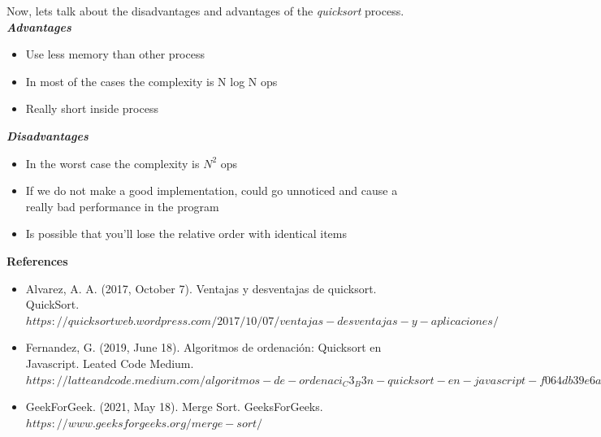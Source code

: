 \documentclass[12pt, letterpaper]{article}
\begin{document}
Now, lets talk about the disadvantages and advantages of the \textit{quicksort} process.
\\
\textbf{\textit{Advantages}}
\begin{itemize}
\item Use less memory than other process
\item In most of the cases the complexity is N log N ops
\item Really short inside process
\end{itemize}
\textbf{\textit{Disadvantages}}
\begin{itemize}
\item In the worst case the complexity is ${N^2}$ ops
\item If we do not make a good implementation, could go unnoticed and cause a really bad performance in the program
\item Is possible that you'll lose the relative order with identical items
\end{itemize}
\newpage
\textbf{References}
\begin{itemize}
\item Alvarez, A. A. (2017, October 7). Ventajas y desventajas de quicksort. QuickSort. $https://quicksortweb.wordpress.com/2017/10/07/ventajas-desventajas-y-aplicaciones/$
\item Fernandez, G. (2019, June 18). Algoritmos de ordenación: Quicksort en Javascript. Leated Code Medium. $https://latteandcode.medium.com/algoritmos-de-ordenaci_C3_B3n-quicksort-en-javascript-f064db39e6ad$
\item GeekForGeek. (2021, May 18). Merge Sort. GeeksForGeeks. $https://www.geeksforgeeks.org/merge-sort/$
\end{itemize}
\end{document}
